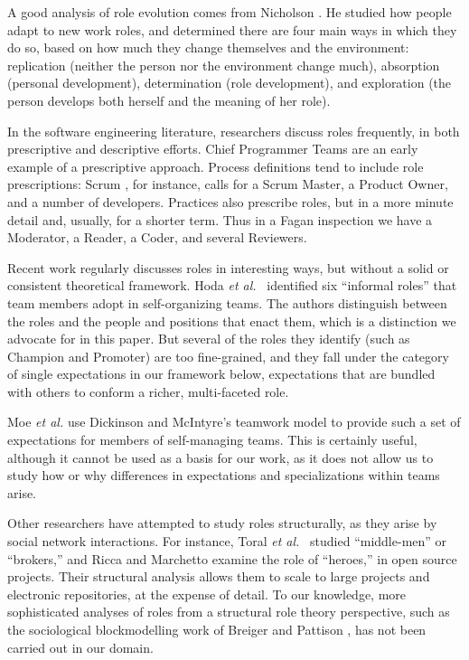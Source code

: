 \documentclass[10pt, conference, compsocconf]{IEEEtran}
\begin{document}
A good analysis of role evolution comes from Nicholson \cite{Nicholson1984}. He studied how people adapt to new work roles, and determined there are four main ways in which they do so, based on how much they change themselves and the environment: replication (neither the person nor the environment change much), absorption (personal development), determination (role development), and exploration (the person develops both herself and the meaning of her role).

In the software engineering literature, researchers discuss roles frequently, in both prescriptive and descriptive efforts. Chief Programmer Teams \cite{Baker1972} are an early example of a prescriptive approach. Process definitions tend to include role prescriptions: Scrum \cite{Schwaber2001}, for instance, calls for a Scrum Master, a Product Owner, and a number of developers. Practices also prescribe roles, but in a more minute detail and, usually, for a shorter term. Thus in a Fagan inspection \cite{Fagan1976} we have a Moderator, a Reader, a Coder, and several Reviewers.

Recent work regularly discusses roles in interesting ways, but without a solid or consistent theoretical framework. Hoda \emph{et al.}\ \cite{Hoda2010} identified six ``informal roles'' that team members adopt in self-organizing teams. The authors distinguish between the roles and the people and positions that enact them, which is a distinction we advocate for in this paper. But several of the roles they identify (such as Champion and Promoter) are too fine-grained, and they fall under the category of single expectations in our framework below, expectations that are bundled with others to conform a richer, multi-faceted role.

Moe \emph{et al.} \cite{Moe2010} use Dickinson and McIntyre's \cite{Dickinson1997} teamwork model to provide such a set of expectations for members of self-managing teams. This is certainly useful, although it cannot be used as a basis for our work, as it does not allow us to study how or why differences in expectations and specializations within teams arise.

Other researchers have attempted to study roles structurally, as they arise by social network interactions. For instance, Toral \emph{et al.}\ \cite{Toral2010} studied ``middle-men'' or ``brokers,'' and Ricca and Marchetto \cite{Ricca2010} examine the role of ``heroes,'' in open source projects. Their structural analysis allows them to scale to large projects and electronic repositories, at the expense of detail. To our knowledge, more sophisticated analyses of roles from a structural role theory perspective, such as the sociological blockmodelling work of Breiger and Pattison \cite{Breiger1986}, has not been carried out in our domain.
\end{document}
